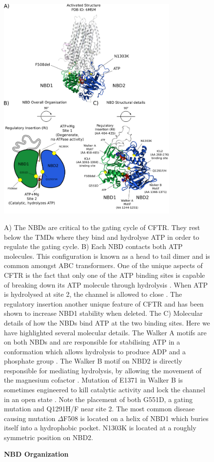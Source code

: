 \begin{figure}
	\begin{center}
	\includegraphics[width=0.8\textwidth]{figures/ATP_head_to_tail_figure.pdf}
	\end{center}
	\label{NBD_structure}
	\captionsetup{singlelinecheck = false, justification=raggedright}
	\caption[NBD Organisation] {\textbf{NBD Organization}}{A) The NBDs are critical to the gating cycle of CFTR. They rest below the TMDs where they bind and hydrolyse ATP in order to regulate the gating cycle. B) Each NBD contacts both ATP molecules. This configuration is known as a head to tail dimer and is common amongst ABC transformers. One of the unique aspects of CFTR is the fact that only one of the ATP binding sites is capable of breaking down its ATP molecule through hydrolysis \cite{stratford2007}. When ATP is hydrolysed at site 2, the channel is allowed to close \cite{infield2021}. The regulatory insertion another unique feature of CFTR and has been shown to increase NBD1 stability when deleted. The  C) Molecular details of how the NBDs bind ATP at the two binding sites. Here we have highlighted several molecular details. The Walker A motifs are on both NBDs and are responsible for stabilising ATP in a conformation which allows hydrolysis to produce ADP and a phosphate group \cite{deltoro2016}. The Walker B motif on NBD2 is directly responsible for mediating hydrolysis, by allowing the movement of the magnesium cofactor \cite{urbatsch2000, rai2006}. Mutation of E1371 in Walker B is sometimes engineered to kill catalytic activity and lock the channel in an open state \cite{stratford2007, zhang2018}. Note the placement of both G551D, a gating mutation and Q1291H/F near site 2. The most common disease causing mutation $\Delta$F508 is located on a helix of NBD1 which buries itself into a hydrophobic pocket. N1303K is located at a roughly symmetric position on NBD2. } 

\end{figure}

